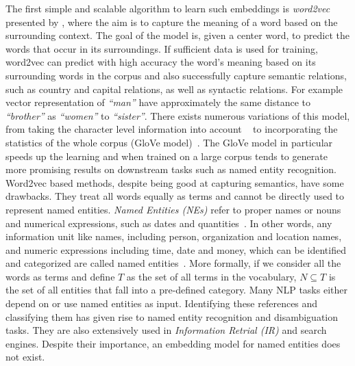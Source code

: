 \noindent
The first simple and scalable algorithm to learn such embeddings is \emph{word2vec} presented by , where the aim is to capture the meaning of a word based on the surrounding context. The goal of the model is, given a center word, to predict the words that occur in its surroundings. If sufficient data is used for training, word2vec can predict with high accuracy the word's meaning based on its surrounding words in the corpus and also successfully capture semantic relations, such as country and capital relations, as well as syntactic relations. For example vector representation of  \emph{``man''} have approximately the same distance to  \emph{``brother''} as \emph{``women''} to \emph{``sister''}. There exists numerous variations of this model, from taking the character level information into account ~ to incorporating the statistics of the whole corpus (GloVe model)~. The GloVe model in particular speeds up the learning and when trained on a large corpus tends to generate more promising results on downstream tasks such as named entity recognition.\\
Word2vec based methods, despite being good at capturing semantics, have some drawbacks.  They treat all words equally as terms and cannot be directly used to represent named entities. \emph{Named Entities (NEs)} refer to proper names or nouns and numerical
expressions, such as dates and quantities~. In other words, any information unit like names, including person,
organization and location names, and numeric expressions including time, date and money, which can be identified and categorized are called named entities~. More formally, if we consider all the words as terms and define $T$ as the set of all terms in the vocabulary, $N\subseteq T$ is the set of all entities that fall into a pre-defined category. Many NLP tasks either depend on or use named entities as input. Identifying these references and classifying them has given rise to named entity recognition and disambiguation tasks. They are also extensively used in \emph{Information Retrial (IR)} and search engines. Despite their importance, an embedding model for named entities does not exist. \\
